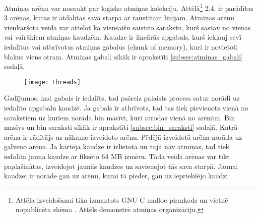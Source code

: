 Atmiņas arēnu var nosaukt par loģisko atmiņas kolekciju. Attēlā\footnote{Attēla izveidošanai tika izmantots GNU C malloc pirmkods \cite {MALLOC} un vietnē nopublicēta shēma \cite{AMM}. Attēls demonstrē atmiņas organizāciju.} 2.4. ir parādītas 3 arēnas, kuras ir atdalītas savā starpā ar raustītam līnijām.
 Atmiņas arēnu  vienkāršotā veidā var attēlot kā viensaišu saistīto sarakstu, kurš sastāv no vienas vai vairākiem atmiņas kaudzēm. 
 Kaudze ir lineārās apgabals, kurš iekļauj sevī iedalītus vai atbrīvotus atmiņas gabalus (chunk of memory), kuri ir novietoti blakus viens otram.
 Atmiņas gabali sīkāk ir aprakstīti \ref{subsec:atminas_gabali} sadaļā.
 \begin{figure}[h]
\begin{center}
\texttt{[image: threads]}
\end{center}
\caption{\textbf{\fontsize{11}{12}\selectfont {Arēnas GNU C bibliotēkā (versija 2.3)}}}
\end{figure}
 Gadījumos, kad gabals ir iedalīts, tad pašreiz palaists process satur norādi uz iedalīto apgabalu kaudzē. 
 Ja gabals ir atbrīvots, tad tas tiek pievienots vienā no sarakstiem uz kuriem norāda bin masīvi, kuri atrodas vienā no arēnām.
Bin masīvs un bin saraksti sīkāk ir aprakstīti \ref{subsec:bin_saraksti} sadaļā. 
 Katrā arēna ir rādītājs uz nākamo izveidoto arēnu. Pēdējā izveidotā arēna norāda uz galveno arēnu.
 Ja kārtēja kaudze ir izlietotā un tajā nav atmiņas, tad tiek iedalīta jauna kaudze ar fiksēto 64 MB izmēru.
  Tāda veidā arēnas var tikt paplašinātas, izveidojot jaunās kaudzes un savienojot tās sava starpā.
 Jaunai kaudzei ir norāde gan uz arēnu, kurai tā pieder, gan uz iepriekšējo kaudzi.

